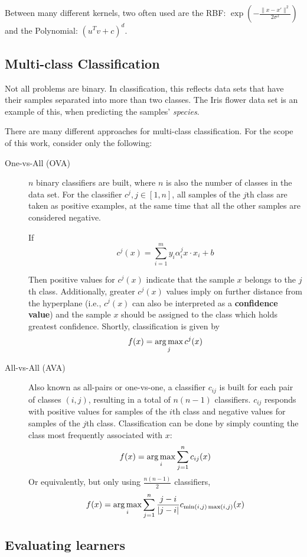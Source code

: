 Between many different kernels, two often used are the RBF: $\exp(-\frac{\|x -x'\|^2}{2\sigma^2})$ and the Polynomial: $(u^T v + c)^{d}$. \cite{svmkernels}

\subsection{Multi-class Classification}

Not all problems are binary. In classification, this reflects data sets that have their samples separated into more than two classes. The Iris flower data set is an example of this, when predicting the samples' {\em species}.

There are many different approaches for multi-class classification. \cite{rif2008} For the scope of this work, consider only the following:

\begin{description}
	\item[One-vs-All (OVA)] $n$ binary classifiers are built, where $n$ is also the number of classes in the data set. For the classifier $c^j, j \in [1, n]$, all samples of the $j$th class are taken as positive examples, at the same time that all the other samples are considered negative.

	If
	$$c^j(x) = \sum_{i=1}^{m} y_i \alpha_i^j x \cdot x_i + b$$

	Then positive values for $c^j(x)$ indicate that the sample $x$ belongs to the $j$th class. Additionally, greater $c^j(x)$ values imply on further distance from the hyperplane (i.e., $c^j(x)$ can also be interpreted as a \textbf{confidence value}) and the sample $x$ should be assigned to the class which holds greatest confidence. \cite{ovacj} Shortly, classification is given by
	$$ f(x) = \operatorname*{arg\,max}_j{c^j(x)} $$
	\item[All-vs-All (AVA)] Also known as all-pairs or one-vs-one, a classifier $c_{ij}$ is built for each pair of classes $(i, j)$, resulting in a total of $n(n-1)$ classifiers. $c_{ij}$ responds with positive values for samples of the $i$th class and negative values for samples of the $j$th class. Classification can be done by simply counting the class most frequently associated with $x$:
	$$ f(x) = \operatorname*{arg\,max}_i{\sum_{j=1}^{n} c_{ij}(x)} $$
	Or equivalently, but only using $\frac{n(n-1)}{2}$ classifiers,
	$$ f(x) = \operatorname*{arg\,max}_i{\sum_{j=1}^{n} \frac{j-i}{|j-i|} c_{\min(i, j) \max(i, j)}(x)} $$
\end{description}

\subsection{Evaluating learners}

